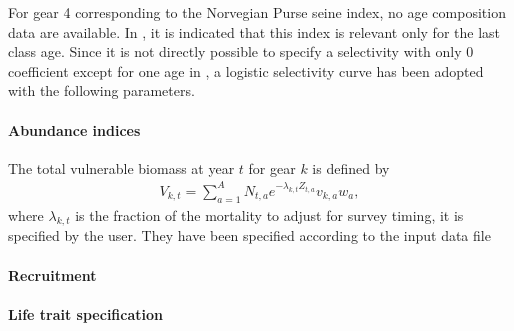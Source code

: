 For gear  4 corresponding to the  Norvegian Purse seine index,  no age
composition data  are available.  In \cite{tuna2012}, it  is indicated
that this index is  relevant only for the last class  age. Since it is
not  directly   possible  to  specify   a  selectivity  with   only  0
coefficient except for one age in \iscam, a logistic selectivity curve has been
adopted with the following parameters.


\paragraph{Abundance indices}



The total vulnerable biomass at year $t$ for gear $k$ is defined by
\begin{gather}
V_{k,t}=\sum_{a=1}^A N_{t,a} e^{-\lambda_{k,t} Z_{t,a}} v_{k,a} w_a,
\end{gather}
 where $\lambda_{k,t}$ is the fraction  of the mortality to adjust for
 survey timing, it is specified by the user. They have been
 specified according to the input data file 


\paragraph{Recruitment}


\paragraph{Life trait specification}

